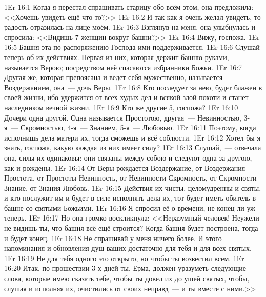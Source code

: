 \vs 1Er 16:1
Когда я перестал спрашивать старицу обо всём этом,
она предложила:
<<Хочешь увидеть ещё что-то?>>
\vs 1Er 16:2
И так как я очень желал
увидеть, то радость отразилась на лице моём.
\vs 1Er 16:3
Взглянув на меня, она улыбнулась
и спросила:
<<Видишь 7 женщин вокруг башни?>>
\vs 1Er 16:4
Вижу, госпожа.
\vs 1Er 16:5
Башня эта по распоряжению Господа ими поддерживается.
\vs 1Er 16:6
Слушай теперь об их действиях.
Первая из них, которая держит башню руками, называется Верою;
посредством неё спасаются избранники Божьи.
\vs 1Er 16:7
Другая же, которая препоясана и ведет себя мужественно,
называется Воздержанием, она~--- дочь Веры.
\vs 1Er 16:8
Кто последует за нею, будет блажен в своей жизни,
ибо удержится от всех худых дел и всякой злой
похоти и станет наследником вечной жизни.
\vs 1Er 16:9
Кто же другие 5, госпожа?
\vs 1Er 16:10
Дочери одна другой.
Одна называется Простотою,
другая~--- Невинностью,
3-я~--- Скромностью,
4-я~--- Знанием,
5-я~--- Любовью.
\vs 1Er 16:11
Поэтому, когда исполнишь дела матери их,
тогда сможешь и всё соблюсти.
\vs 1Er 16:12
Хотел бы я знать, госпожа, какую каждая из них имеет силу?
\vs 1Er 16:13
Слушай,~--- отвечала она, силы их одинаковы:
они связаны между собою и следуют одна за другою,
как и рождены.
\vs 1Er 16:14
От Веры рождается Воздержание,
от Воздержания Простота,
от Простоты Невинность,
от Невинности Скромность,
от Скромности Знание,
от Знания Любовь.
\vs 1Er 16:15
Действия их чисты, целомудренны и святы,
и кто послужит им и будет в силе исполнять дела их, тот
будет иметь обитель в башне со святыми Божьими.
\vs 1Er 16:16
Я спросил её о времени, не конец ли уж теперь.
\vs 1Er 16:17
Но она громко воскликнула:
<<Неразумный человек!
Неужели не видишь ты, что башня всё ещё строится?
Когда башня будет построена, тогда и будет конец.
\vs 1Er 16:18
Не спрашивай у меня ничего более.
И этого напоминания и обновления душ ваших
достаточно для тебя и для всех святых.
\vs 1Er 16:19
Не для тебя одного это открыто, но чтобы ты возвестил всем.
\vs 1Er 16:20
Итак, по прошествии 3-х дней ты, Ерма,
должен уразуметь следующие слова, которые имею сказать тебе,
чтобы ты довел их до ушей святых, чтобы, слушая и исполняя их,
очистились от своих неправд~--- и ты вместе с ними.>>

